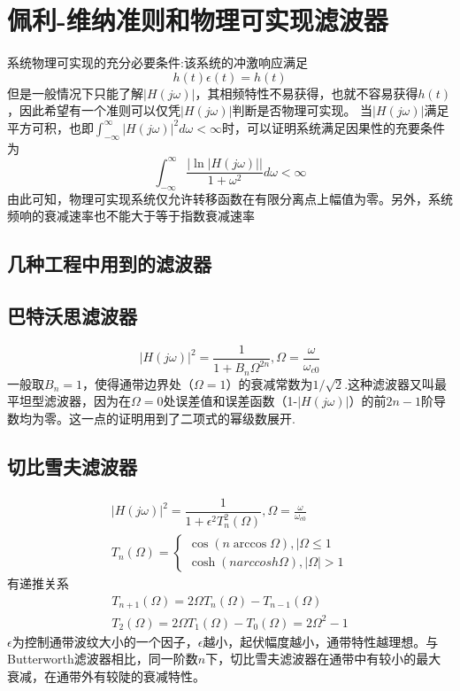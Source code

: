\section{佩利-维纳准则和物理可实现滤波器}
系统物理可实现的充分必要条件:该系统的冲激响应满足
\begin{equation}
    h(t)\epsilon(t)=h(t)
\end{equation}
但是一般情况下只能了解$|H(j\omega)|$，其相频特性不易获得，也就不容易获得$h(t)$，因此希望有一个准则可以仅凭$|H(j\omega)|$判断是否物理可实现。
当$|H(j\omega)|$满足平方可积，也即$\int_{-\infty}^{\infty}|H(j\omega)|^2d\omega <\infty$时，可以证明系统满足因果性的充要条件为
\begin{equation}
    \int_{-\infty}^{\infty}\dfrac{|\ln |H(j\omega)| |}{1+\omega^2}d\omega <\infty
\end{equation}
由此可知，物理可实现系统仅允许转移函数在有限分离点上幅值为零。另外，系统频响的衰减速率也不能大于等于指数衰减速率
\subsection{几种工程中用到的滤波器}
\subsection{巴特沃思滤波器}
\begin{equation}
    |H(j\omega)|^2=\dfrac{1}{1+B_n \Omega^{2n}},\Omega=\frac{\omega}{\omega_{c0}}
\end{equation}
一般取$B_n=1$，使得通带边界处（$\Omega=1$）的衰减常数为$1/\sqrt{2}$.这种滤波器又叫最平坦型滤波器，因为在$\Omega=0$处误差值和误差函数（1-$ |H(j\omega)|$）的前$2n-1$阶导数均为零。这一点的证明用到了二项式的幂级数展开.
\subsection{切比雪夫滤波器}
\begin{align}
    |H(j\omega)|^2=\dfrac{1}{1+\epsilon^2 T_n^{2}(\Omega)},\Omega=\frac{\omega}{\omega_{c0}}\\
    T_n(\Omega)=
    \begin{cases}
        \cos ( n \arccos \Omega) , |\Omega \leq 1\\
        \cosh (n arccosh \Omega),|\Omega|>1
    \end{cases}
\end{align}
有递推关系
\begin{align}
    T_{n+1}(\Omega)=2\Omega T_{n}(\Omega)-T_{n-1}(\Omega)\\
    T_2(\Omega)=2\Omega T_1(\Omega)-T_0(\Omega)=2\Omega^2-1
\end{align}
$\epsilon$为控制通带波纹大小的一个因子，$\epsilon$越小，起伏幅度越小，通带特性越理想。与Butterworth滤波器相比，同一阶数$n$下，切比雪夫滤波器在通带中有较小的最大衰减，在通带外有较陡的衰减特性。

